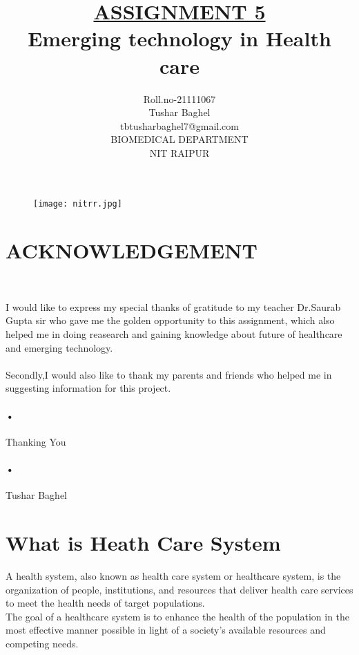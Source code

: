 \documentclass[12pt]{report}
\title{\underline{ASSIGNMENT 5} \\
Emerging technology in Health care  }
\author{Roll.no-21111067\\Tushar Baghel\\tbtusharbaghel7@gmail.com\\BIOMEDICAL DEPARTMENT\\NIT RAIPUR\\}
\begin{document}
\begin{figure}
\centering
\texttt{[image: nitrr.jpg]}
\end{figure}
\maketitle
\clearpage
\tableofcontents
\clearpage

\section{ACKNOWLEDGEMENT}\


I would like to express my special thanks of gratitude to my teacher Dr.Saurab Gupta sir who gave me the golden opportunity to this assignment, which also helped me in doing reasearch and gaining knowledge about future of healthcare and emerging technology.\paragraph{}

Secondly,I would also like to thank my parents and friends who helped me in suggesting information for this project.\paragraph{•}


Thanking You\paragraph{•}

Tushar Baghel 

\clearpage


\section{What is Heath Care System}

A health system, also known as health care system or healthcare system, is the organization of people, institutions, and resources that deliver health care services to meet the health needs of target populations.\\
The goal of a healthcare system is to enhance the health of the population in the most effective manner possible in light of a society's available resources and competing needs.
\end{document}
